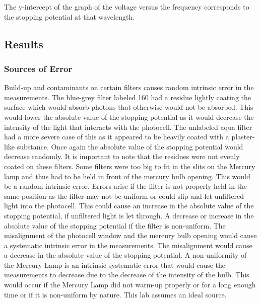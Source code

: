\documentclass[a4paper]{article}
\begin{document}

\qq The y-intercept of the graph of the voltage versus the
frequency corresponds to the stopping potential at that wavelength. 
 

\subsection{Results}


\subsubsection{Sources of Error}

\qq Build-up and contaminants on certain filters causes random
intrinsic error in the measurements. The blue-grey filter labeled 160
had a residue lightly coating the surface which would absorb photons
that otherwise would not be absorbed. This would lower the absolute
value of the stopping potential as it would decrease the intensity of
the light that interacts with the photocell. The unlabeled aqua filter
had a more severe case of this as it appeared to be heavily coated
with a plaster-like substance. Once again the absolute value of the
stopping potential would decrease randomly. It is important to note
that the residues were not evenly coated on these filters. Some
filters were too big to fit in the slits on the Mercury lamp and thus
had to be held in front of the mercury bulb opening. This would be a
random intrinsic error. Errors arise if the filter is not properly
held in the same position as the filter may not be uniform or could
slip and let unfiltered light into the photocell. This could cause an
increase in the absolute value of the stopping potential, if
unfiltered light is let through. A decrease or increase in the
absolute value of the stopping potential if the filter is
non-uniform. The misalignment of the photocell window and the mercury
bulb opening would cause a systematic intrinsic error in the
measurements. The misalignment would cause a decrease in the absolute
value of the stopping potential. A non-uniformity of the Mercury Lamp
is an intrinsic systematic error that would cause the measurements to
decrease due to the decrease of the intensity of the bulb. This would
occur if the Mercury Lamp did not warm-up properly or for a long
enough time or if it is non-uniform by nature. This lab assumes an
ideal source.
\end{document}
